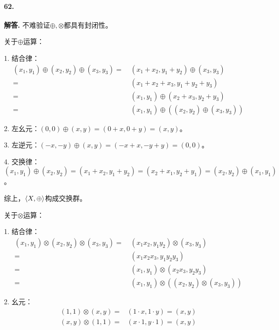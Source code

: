 \documentclass[12pt, a4paper, oneside]{ctexart}
\newenvironment{solution}{\par\noindent\textbf{解答. }}{\bigskip\par}
\begin{document}
\paragraph{62.}\begin{solution}不难验证$\oplus,\otimes$都具有封闭性。

    关于$\oplus$运算：

    1. 结合律：\begin{equation*}
        \begin{aligned}
            (x_1,y_1)\oplus(x_2,y_2)\oplus(x_3,y_3)=\ &(x_1+x_2,y_1+y_2)\oplus(x_3,y_3)\\
            =\ &(x_1+x_2+x_3,y_1+y_2+y_3)\\
            =\ &(x_1,y_1)\oplus(x_2+x_3,y_2+y_3)\\
            =\ &(x_1,y_1)\oplus((x_2,y_2)\oplus (x_3,y_3))
        \end{aligned}
    \end{equation*}

    2. 左幺元：$(0,0)\oplus(x, y) = (0+x,0+y)=(x, y)$。

    3. 左逆元：$(-x,-y)\oplus(x,y) = (-x+x,-y+y) = (0,0)$。

    4. 交换律：$(x_1,y_1)\oplus(x_2,y_2) = (x_1+x_2,y_1+y_2) = (x_2+x_1,y_2+y_1)=(x_2,y_2)\oplus (x_1,y_1)$。

    综上，$\braket{X, \oplus}$构成交换群。

    关于$\otimes$运算：

    1. 结合律：\begin{equation*}
        \begin{aligned}
            (x_1,y_1)\otimes (x_2,y_2)\otimes(x_3,y_3)=\ &(x_1x_2,y_1y_2)\otimes(x_3,y_3)\\
            =\ &(x_1x_2x_3,y_1y_2y_3)\\
            =\ &(x_1,y_1)\otimes(x_2x_3,y_2y_3)\\
            =\ &(x_1,y_1)\otimes((x_2,y_2)\otimes(x_3,y_3))
        \end{aligned}
    \end{equation*}

    2. 幺元：
    \begin{equation*}
        \begin{aligned}
            (1,1)\otimes(x,y) =& (1\cdot x, 1\cdot y) = (x, y)\\
            (x,y)\otimes(1,1) =& (x\cdot 1, y\cdot 1) = (x, y)
        \end{aligned}
    \end{equation*}


\end{solution}
\end{document}
